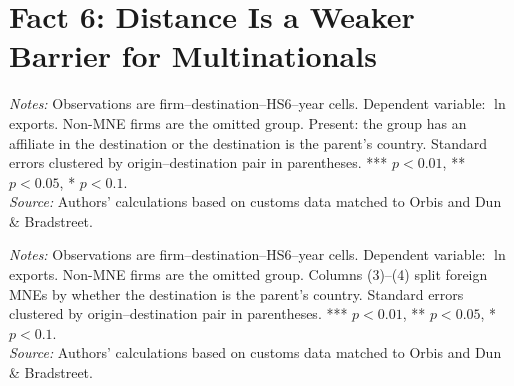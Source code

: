 \documentclass[11pt,a4paper]{article}
\begin{document}
\section*{Fact 6: Distance Is a Weaker Barrier for Multinationals}%
\begin{table}[H]\centering\small%
  \caption{Distance and Firm Exports: Multinationals by Presence at the Destination}%
  \label{tab:d_t2}%
  \par\vspace{3pt}%
  \begin{minipage}{0.95\textwidth}\footnotesize %
  \textit{Notes:} Observations are firm--destination--HS6--year cells. Dependent variable: $\ln$ exports. Non-MNE firms are the omitted group. Present: the group has an affiliate in the destination or the destination is the parent's country. Standard errors clustered by origin--destination pair in parentheses. *** $p<0.01$, ** $p<0.05$, * $p<0.1$.\\[3pt]%
  \textit{Source:} Authors' calculations based on customs data matched to Orbis and Dun \& Bradstreet.%
  \end{minipage}%
  \end{table}
\begin{table}[H]\centering\small%
  \caption{Distance and Firm Exports: Foreign and Domestic Multinationals}%
  \label{tab:d_dist}%
  \par\vspace{3pt}%
  \begin{minipage}{0.95\textwidth}\footnotesize %
  \textit{Notes:} Observations are firm--destination--HS6--year cells. Dependent variable: $\ln$ exports. Non-MNE firms are the omitted group. Columns (3)--(4) split foreign MNEs by whether the destination is the parent's country. Standard errors clustered by origin--destination pair in parentheses. *** $p<0.01$, ** $p<0.05$, * $p<0.1$.\\[3pt]%
  \textit{Source:} Authors' calculations based on customs data matched to Orbis and Dun \& Bradstreet.%
  \end{minipage}%
  \end{table}
\end{document}
